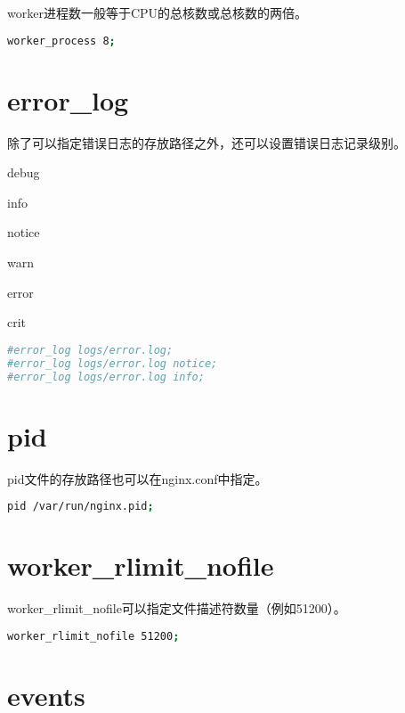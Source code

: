 worker进程数一般等于CPU的总核数或总核数的两倍。

\begin{lstlisting}[language=bash]
worker_process 8;
\end{lstlisting}


\section{error\_log}

除了可以指定错误日志的存放路径之外，还可以设置错误日志记录级别。

\begin{compactitem}
\item debug
\item info
\item notice
\item warn
\item error
\item crit
\end{compactitem}




\begin{lstlisting}[language=bash]
#error_log logs/error.log;
#error_log logs/error.log notice;
#error_log logs/error.log info;
\end{lstlisting}




\section{pid}


pid文件的存放路径也可以在nginx.conf中指定。

\begin{lstlisting}[language=bash]
pid /var/run/nginx.pid;
\end{lstlisting}

\section{worker\_rlimit\_nofile}

worker\_rlimit\_nofile可以指定文件描述符数量（例如51200）。

\begin{lstlisting}[language=bash]
worker_rlimit_nofile 51200;
\end{lstlisting}


\section{events}

